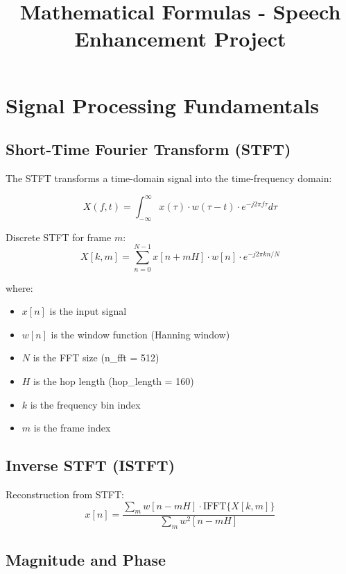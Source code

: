 \documentclass[12pt,a4paper]{article}
\title{Mathematical Formulas - Speech Enhancement Project}
\author{}
\date{}
\begin{document}
\maketitle

\tableofcontents
\newpage

\section{Signal Processing Fundamentals}

\subsection{Short-Time Fourier Transform (STFT)}

The STFT transforms a time-domain signal into the time-frequency domain:

\begin{equation}
X(f, t) = \int_{-\infty}^{\infty} x(\tau) \cdot w(\tau - t) \cdot e^{-j2\pi f\tau} d\tau
\end{equation}

Discrete STFT for frame $m$:
\begin{equation}
X[k, m] = \sum_{n=0}^{N-1} x[n + mH] \cdot w[n] \cdot e^{-j2\pi kn/N}
\end{equation}

where:
\begin{itemize}
    \item $x[n]$ is the input signal
    \item $w[n]$ is the window function (Hanning window)
    \item $N$ is the FFT size (n\_fft = 512)
    \item $H$ is the hop length (hop\_length = 160)
    \item $k$ is the frequency bin index
    \item $m$ is the frame index
\end{itemize}

\subsection{Inverse STFT (ISTFT)}

Reconstruction from STFT:
\begin{equation}
x[n] = \frac{\sum_{m} w[n - mH] \cdot \text{IFFT}\{X[k, m]\}}{\sum_{m} w^2[n - mH]}
\end{equation}

\subsection{Magnitude and Phase}
\end{document}
